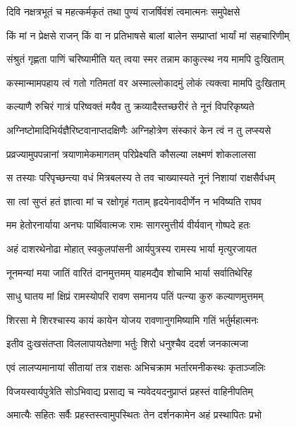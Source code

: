 \twolineshloka
{दिवि नक्षत्रभूतं च महत्कर्मकृतं तथा}
{पुण्यं राजर्षिवंशं त्वमात्मनः समुपेक्षसे} %

\twolineshloka
{किं मां न प्रेक्षसे राजन् किं वा न प्रतिभाषसे}
{बालां बालेन सम्प्राप्तां भार्यां मां सहचारिणीम्} %

\twolineshloka
{संश्रुतं गृह्णता पाणिं चरिष्यामीति यत् त्वया}
{स्मर तन्नाम काकुत्स्थ नय मामपि दुःखिताम्} %

\twolineshloka
{कस्मान्मामपहाय त्वं गतो गतिमतां वर}
{अस्माल्लोकादमुं लोकं त्यक्त्वा मामपि दुःखिताम्} %

\twolineshloka
{कल्याणै रुचिरं गात्रं परिष्वक्तं मयैव तु}
{क्रव्यादैस्तच्छरीरं ते नूनं विपरिकृष्यते} %

\twolineshloka
{अग्निष्टोमादिभिर्यज्ञैरिष्टवानाप्तदक्षिणैः}
{अग्निहोत्रेण संस्कारं केन त्वं न तु लप्स्यसे} %

\twolineshloka
{प्रव्रज्यामुपपन्नानां त्रयाणामेकमागतम्}
{परिप्रेक्ष्यति कौसल्या लक्ष्मणं शोकलालसा} %

\twolineshloka
{स तस्याः परिपृच्छन्त्या वधं मित्रबलस्य ते}
{तव चाख्यास्यते नूनं निशायां राक्षसैर्वधम्} %

\twolineshloka
{सा त्वां सुप्तं हतं ज्ञात्वा मां च रक्षोगृहं गताम्}
{हृदयेनावदीर्णेन न भविष्यति राघव} %

\twolineshloka
{मम हेतोरनार्याया अनघः पार्थिवात्मजः}
{रामः सागरमुत्तीर्य वीर्यवान् गोष्पदे हतः} %

\twolineshloka
{अहं दाशरथेनोढा मोहात् स्वकुलपांसनी}
{आर्यपुत्रस्य रामस्य भार्या मृत्युरजायत} %

\twolineshloka
{नूनमन्यां मया जातिं वारितं दानमुत्तमम्}
{याहमद्यैव शोचामि भार्या सर्वातिथेरिह} %

\twolineshloka
{साधु घातय मां क्षिप्रं रामस्योपरि रावण}
{समानय पतिं पत्न्या कुरु कल्याणमुत्तमम्} %

\twolineshloka
{शिरसा मे शिरश्चास्य कायं कायेन योजय}
{रावणानुगमिष्यामि गतिं भर्तुर्महात्मनः} %

\twolineshloka
{इतीव दुःखसंतप्ता विललापायतेक्षणा}
{भर्तुः शिरो धनुश्चैव ददर्श जनकात्मजा} %

\twolineshloka
{एवं लालप्यमानायां सीतायां तत्र राक्षसः}
{अभिचक्राम भर्तारमनीकस्थः कृताञ्जलिः} %

\twolineshloka
{विजयस्वार्यपुत्रेति सोऽभिवाद्य प्रसाद्य च}
{न्यवेदयदनुप्राप्तं प्रहस्तं वाहिनीपतिम्} %

\twolineshloka
{अमात्यैः सहितः सर्वैः प्रहस्तस्त्वामुपस्थितः}
{तेन दर्शनकामेन अहं प्रस्थापितः प्रभो} %

